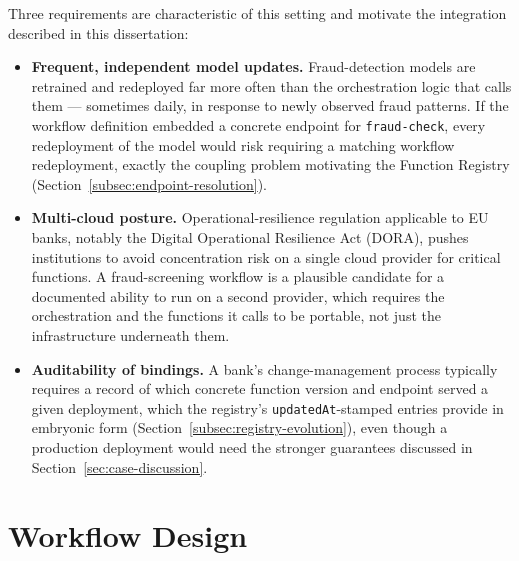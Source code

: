 Three requirements are characteristic of this setting and motivate the integration described in
this dissertation:

\begin{itemize}
    \item \textbf{Frequent, independent model updates.} Fraud-detection models are retrained and
    redeployed far more often than the orchestration logic that calls them --- sometimes daily, in
    response to newly observed fraud patterns. If the workflow definition embedded a concrete
    endpoint for \texttt{fraud-check}, every redeployment of the model would risk requiring a
    matching workflow redeployment, exactly the coupling problem motivating the Function Registry
    (Section~\ref{subsec:endpoint-resolution}).
    \item \textbf{Multi-cloud posture.} Operational-resilience regulation applicable to EU banks,
    notably the Digital Operational Resilience Act (DORA), pushes institutions to avoid
    concentration risk on a single cloud provider for critical functions. A fraud-screening
    workflow is a plausible candidate for a documented ability to run on a second provider, which
    requires the orchestration and the functions it calls to be portable, not just the
    infrastructure underneath them.
    \item \textbf{Auditability of bindings.} A bank's change-management process typically requires
    a record of which concrete function version and endpoint served a given deployment, which the
    registry's \texttt{updatedAt}-stamped entries provide in embryonic form
    (Section~\ref{subsec:registry-evolution}), even though a production deployment would need the
    stronger guarantees discussed in Section~\ref{sec:case-discussion}.
\end{itemize}

\section{Workflow Design}
\label{sec:case-design}


